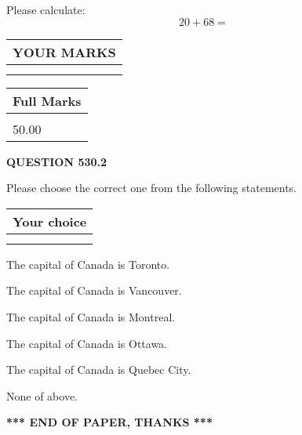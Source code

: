 \documentclass[12pt]{article}
\begin{document}
  
 
Please calculate:
\begin{equation}
20 +  %
68 = \nonumber
\end{equation}
 

 

 
  
\vspace{0.2in}
  
\noindent\begin{tabular}{|l|}
\hline
 YOUR MARKS  \\
\hline
 \\ 
 \\ 
\hline
\end{tabular}
\hspace{0.05in} \begin{tabular}{|l|}
\hline
 Full Marks  \\
\hline
 \\ 
50.00 \\
\hline
\end{tabular}
{\textbf{\Large{QUESTION
530.2 
}}}
  
  
Please choose the correct one from the following statements.
  
  
\noindent\hspace{3.0in} \begin{tabular}{|l|}
\hline
Your choice \\
\hline
 \\ 
 \\ 
\hline
\end{tabular}
  
  
 
 
The capital of Canada is Toronto.
 
 
The capital of Canada is Vancouver.
 
 
The capital of Canada is Montreal.
 
 
The capital of Canada is Ottawa.
 
 
The capital of Canada is Quebec City.
 
 
 None of above.
 
 
   
   
 \vspace{0.2in}
 
   
   
   
   
\vspace{1.0in} 
{\textbf{\large{ *** END OF PAPER, THANKS *** }}} 
   
\end{document}
